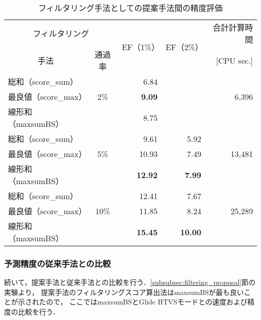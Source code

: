\begin{table}[htb] \centering
	\caption{フィルタリング手法としての提案手法間の精度評価}
	\label{table:filtering_proposal}
	\begin{tabular}{lc|rr|r}
	\hline
	\multicolumn{2}{c|}{フィルタリング}	&\multirow{2}{*}{EF（1\%）}	&\multirow{2}{*}{EF（2\%）}	&合計計算時間	\\
	\multicolumn{1}{c}{手法}	&通過率	&						&						&[CPU sec.]		\\ \hline
	総和（score\_sum）		&		&6.84					&\textendash				&				\\
	最良値（score\_max）	&2\%	&\textbf{9.09}				&\textendash				&6,396			\\
	線形和（maxsumBS）	&		&8.75					&\textendash				&				\\ \hline
	総和（score\_sum）		&		&9.61					&5.92					&				\\
	最良値（score\_max）	&5\%	&10.93					&7.49					&13,481			\\
	線形和（maxsumBS）	&		&\textbf{12.92}			&\textbf{7.99}				&				\\ \hline
	総和（score\_sum）		&		&12.41					&7.67					&				\\
	最良値（score\_max）	&10\%	&11.85					&8.24					&25,289			\\
	線形和（maxsumBS）	&		&\textbf{15.45}			&\textbf{10.00}			&				\\ \hline
	\end{tabular}
\end{table}


\subsubsection{予測精度の従来手法との比較}\label{subsubsec:filtering_comparison}
続いて，提案手法と従来手法との比較を行う．\ref{subsubsec:filtering_proposal}節の実験より，
提案手法のフィルタリングスコア算出法はmaxsumBSが最も良いことが示されたので，
ここではmaxsumBSとGlide HTVSモードとの速度および精度の比較を行う．

